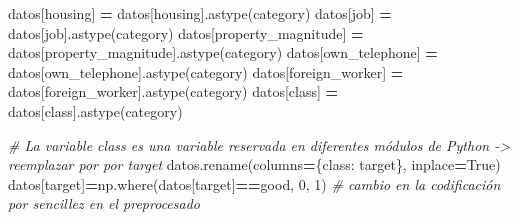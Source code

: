 \documentclass[
  a4paper,
  DIV=11,
  numbers=noendperiod]{scrreprt}
\newenvironment{Shaded}{\begin{snugshade}}{\end{snugshade}}
\newcommand{\CommentTok}[1]{\textcolor[rgb]{0.56,0.35,0.01}{\textit{#1}}}
\newcommand{\DecValTok}[1]{\textcolor[rgb]{0.00,0.00,0.81}{#1}}
\newcommand{\NormalTok}[1]{#1}
\newcommand{\OperatorTok}[1]{\textcolor[rgb]{0.81,0.36,0.00}{\textbf{#1}}}
\newcommand{\StringTok}[1]{\textcolor[rgb]{0.31,0.60,0.02}{#1}}
\newcommand{\VariableTok}[1]{\textcolor[rgb]{0.00,0.00,0.00}{#1}}
\begin{document}
\begin{Shaded}
\begin{Highlighting}[numbers=left,,]
\NormalTok{datos[}\StringTok{\textquotesingle{}housing\textquotesingle{}}\NormalTok{] }\OperatorTok{=}\NormalTok{ datos[}\StringTok{\textquotesingle{}housing\textquotesingle{}}\NormalTok{].astype(}\StringTok{\textquotesingle{}category\textquotesingle{}}\NormalTok{)}
\NormalTok{datos[}\StringTok{\textquotesingle{}job\textquotesingle{}}\NormalTok{] }\OperatorTok{=}\NormalTok{ datos[}\StringTok{\textquotesingle{}job\textquotesingle{}}\NormalTok{].astype(}\StringTok{\textquotesingle{}category\textquotesingle{}}\NormalTok{)}
\NormalTok{datos[}\StringTok{\textquotesingle{}property\_magnitude\textquotesingle{}}\NormalTok{] }\OperatorTok{=}\NormalTok{ datos[}\StringTok{\textquotesingle{}property\_magnitude\textquotesingle{}}\NormalTok{].astype(}\StringTok{\textquotesingle{}category\textquotesingle{}}\NormalTok{)}
\NormalTok{datos[}\StringTok{\textquotesingle{}own\_telephone\textquotesingle{}}\NormalTok{] }\OperatorTok{=}\NormalTok{ datos[}\StringTok{\textquotesingle{}own\_telephone\textquotesingle{}}\NormalTok{].astype(}\StringTok{\textquotesingle{}category\textquotesingle{}}\NormalTok{)}
\NormalTok{datos[}\StringTok{\textquotesingle{}foreign\_worker\textquotesingle{}}\NormalTok{] }\OperatorTok{=}\NormalTok{ datos[}\StringTok{\textquotesingle{}foreign\_worker\textquotesingle{}}\NormalTok{].astype(}\StringTok{\textquotesingle{}category\textquotesingle{}}\NormalTok{)}
\NormalTok{datos[}\StringTok{\textquotesingle{}class\textquotesingle{}}\NormalTok{] }\OperatorTok{=}\NormalTok{ datos[}\StringTok{\textquotesingle{}class\textquotesingle{}}\NormalTok{].astype(}\StringTok{\textquotesingle{}category\textquotesingle{}}\NormalTok{)}
\end{Highlighting}
\end{Shaded}

\begin{Shaded}
\begin{Highlighting}[numbers=left,,]
\CommentTok{\# La variable class es una variable reservada en diferentes módulos de Python {-}\textgreater{} reemplazar por por target}
\NormalTok{datos.rename(columns}\OperatorTok{=}\NormalTok{\{}\StringTok{\textquotesingle{}class\textquotesingle{}}\NormalTok{: }\StringTok{\textquotesingle{}target\textquotesingle{}}\NormalTok{\}, inplace}\OperatorTok{=}\VariableTok{True}\NormalTok{)}
\NormalTok{datos[}\StringTok{\textquotesingle{}target\textquotesingle{}}\NormalTok{]}\OperatorTok{=}\NormalTok{np.where(datos[}\StringTok{\textquotesingle{}target\textquotesingle{}}\NormalTok{]}\OperatorTok{==}\StringTok{\textquotesingle{}good\textquotesingle{}}\NormalTok{, }\DecValTok{0}\NormalTok{, }\DecValTok{1}\NormalTok{) }\CommentTok{\# cambio en la codificación por sencillez en el preprocesado}
\end{Highlighting}
\end{Shaded}
\end{document}
